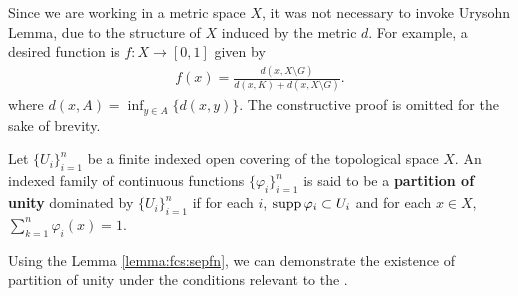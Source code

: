 \begin{remark}
Since we are working in a metric space $X$, it was not necessary to invoke Urysohn Lemma, due to the structure of $X$ induced by the metric $d$. For example, a desired function is $f : X \to [0,1]$ given by
\begin{align*}
     f(x) = \frac{d(x,X \setminus G)}{d(x,K) + d (x, X \setminus G)}.
\end{align*}
where $d(x, A)= \inf_{y \in A} \{ d(x,y) \}.$ The constructive proof is omitted for the sake of brevity.
\end{remark}


\begin{definition}
Let $\{ U_i \}_{i = 1}^n$ be a finite indexed open covering of the topological space $X$. An indexed family of continuous functions $\{ \varphi_{i} \}_{i = 1}^n$ is said to be a \textbf{partition of unity} dominated by $\{ U_i \}_{i = 1}^n$ if for each $i$, $\operatorname{supp} \varphi_i \subset U_i$ and for each $x \in X$, $\sum_{k = 1}^{n} \varphi_{i}(x) = 1$.
\end{definition}

Using the Lemma \ref{lemma:fcs:sepfn}, we can demonstrate the existence of partition of unity under the conditions relevant to the .

